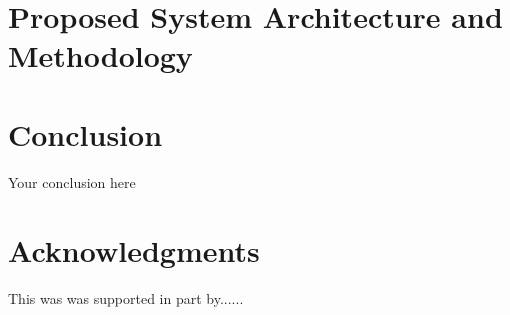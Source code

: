 \documentclass{article}
\begin{document}


\section{Proposed System Architecture and Methodology}
\label{sec:proposed_system}







\section{Conclusion}
Your conclusion here

\section*{Acknowledgments}
This was was supported in part by......

  
  
\end{document}
